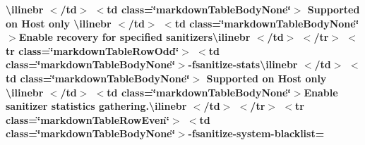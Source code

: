 \begin{longtabu}
{\bfseries{{\ttfamily \textbackslash{}ilinebr \texorpdfstring{$<$}{<}/td\texorpdfstring{$>$}{>} \texorpdfstring{$<$}{<}td class=\char`\"{}markdown\+Table\+Body\+None\char`\"{}\texorpdfstring{$>$}{>} Supported on Host only \textbackslash{}ilinebr \texorpdfstring{$<$}{<}/td\texorpdfstring{$>$}{>} \texorpdfstring{$<$}{<}td class=\char`\"{}markdown\+Table\+Body\+None\char`\"{}\texorpdfstring{$>$}{>}}Enable recovery for specified sanitizers{\ttfamily \textbackslash{}ilinebr \texorpdfstring{$<$}{<}/td\texorpdfstring{$>$}{>} \texorpdfstring{$<$}{<}/tr\texorpdfstring{$>$}{>} \texorpdfstring{$<$}{<}tr class=\char`\"{}markdown\+Table\+Row\+Odd\char`\"{}\texorpdfstring{$>$}{>} \texorpdfstring{$<$}{<}td class=\char`\"{}markdown\+Table\+Body\+None\char`\"{}\texorpdfstring{$>$}{>}}-\/fsanitize-\/stats{\ttfamily \textbackslash{}ilinebr \texorpdfstring{$<$}{<}/td\texorpdfstring{$>$}{>} \texorpdfstring{$<$}{<}td class=\char`\"{}markdown\+Table\+Body\+None\char`\"{}\texorpdfstring{$>$}{>} Supported on Host only \textbackslash{}ilinebr \texorpdfstring{$<$}{<}/td\texorpdfstring{$>$}{>} \texorpdfstring{$<$}{<}td class=\char`\"{}markdown\+Table\+Body\+None\char`\"{}\texorpdfstring{$>$}{>}}Enable sanitizer statistics gathering.{\ttfamily \textbackslash{}ilinebr \texorpdfstring{$<$}{<}/td\texorpdfstring{$>$}{>} \texorpdfstring{$<$}{<}/tr\texorpdfstring{$>$}{>} \texorpdfstring{$<$}{<}tr class=\char`\"{}markdown\+Table\+Row\+Even\char`\"{}\texorpdfstring{$>$}{>} \texorpdfstring{$<$}{<}td class=\char`\"{}markdown\+Table\+Body\+None\char`\"{}\texorpdfstring{$>$}{>}}-\/fsanitize-\/system-\/blacklist=}}


\end{longtabu}
